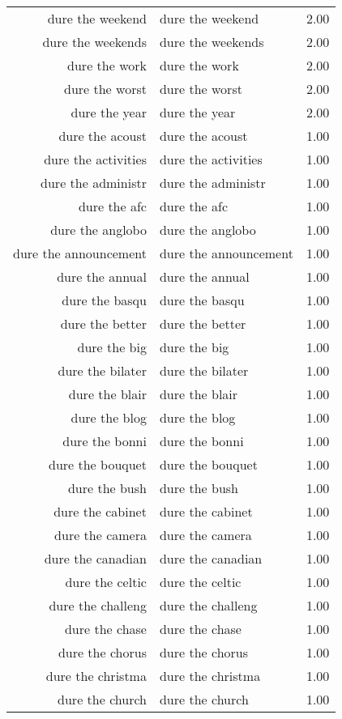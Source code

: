\begin{table}[ht]
\begin{tabular}{rlr}
  dure the weekend & dure the weekend & 2.00 \\ 
  dure the weekends & dure the weekends & 2.00 \\ 
  dure the work & dure the work & 2.00 \\ 
  dure the worst & dure the worst & 2.00 \\ 
  dure the year & dure the year & 2.00 \\ 
  dure the acoust & dure the acoust & 1.00 \\ 
  dure the activities & dure the activities & 1.00 \\ 
  dure the administr & dure the administr & 1.00 \\ 
  dure the afc & dure the afc & 1.00 \\ 
  dure the anglobo & dure the anglobo & 1.00 \\ 
  dure the announcement & dure the announcement & 1.00 \\ 
  dure the annual & dure the annual & 1.00 \\ 
  dure the basqu & dure the basqu & 1.00 \\ 
  dure the better & dure the better & 1.00 \\ 
  dure the big & dure the big & 1.00 \\ 
  dure the bilater & dure the bilater & 1.00 \\ 
  dure the blair & dure the blair & 1.00 \\ 
  dure the blog & dure the blog & 1.00 \\ 
  dure the bonni & dure the bonni & 1.00 \\ 
  dure the bouquet & dure the bouquet & 1.00 \\ 
  dure the bush & dure the bush & 1.00 \\ 
  dure the cabinet & dure the cabinet & 1.00 \\ 
  dure the camera & dure the camera & 1.00 \\ 
  dure the canadian & dure the canadian & 1.00 \\ 
  dure the celtic & dure the celtic & 1.00 \\ 
  dure the challeng & dure the challeng & 1.00 \\ 
  dure the chase & dure the chase & 1.00 \\ 
  dure the chorus & dure the chorus & 1.00 \\ 
  dure the christma & dure the christma & 1.00 \\ 
  dure the church & dure the church & 1.00 \\ 

\end{tabular}
\end{table}
